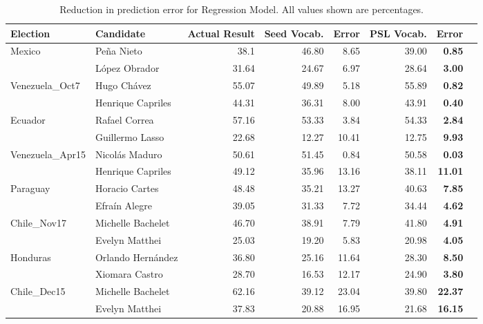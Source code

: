 \begin{table*}
		\centering
		\begin{tabular}{| l | l | r | r | r | r | r | r |}
		\hline
		Election & Candidate & Actual Result & Seed Vocab. & Error & PSL Vocab. & Error \\
		\hline
		\multirow{2}{*}{Mexico} & Pe\~{n}a Nieto & 38.1 & 46.80 & 8.65 & 39.00 & \textbf{0.85} \\\cline{2-7}
											   & L\'{o}pez Obrador & 31.64 & 24.67 & 6.97 & 28.64 & \textbf{3.00} \\
		\hline
		\multirow{2}{*}{Venezuela\_Oct7} & Hugo Ch\'{a}vez & 55.07 & 49.89 & 5.18 & 55.89 & \textbf{0.82}\\\cline{2-7}
																& Henrique Capriles & 44.31 & 36.31 & 8.00 & 43.91 & \textbf{0.40} \\
		\hline
		\multirow{2}{*}{Ecuador} & Rafael Correa & 57.16 & 53.33 & 3.84 & 54.33 & \textbf{2.84} \\\cline{2-7}
												 & Guillermo Lasso & 22.68 & 12.27 & 10.41 & 12.75 & \textbf{9.93} \\
		\hline
		 \multirow{2}{*}{Venezuela\_Apr15} & Nicol\'{a}s Maduro & 50.61 & 51.45 & 0.84 & 50.58 & \textbf{0.03} \\\cline{2-7}
																	& Henrique Capriles & 49.12 & 35.96 & 13.16 & 38.11 & \textbf{11.01} \\
		\hline
		\multirow{2}{*}{Paraguay} & Horacio Cartes & 48.48 & 35.21 & 13.27 & 40.63 & \textbf{7.85} \\\cline{2-7}
												   & Efra\'{i}n Alegre & 39.05 & 31.33 & 7.72 & 34.44 & \textbf{4.62} \\
		\hline
		\multirow{2}{*}{Chile\_Nov17} & Michelle Bachelet & 46.70 & 38.91 & 7.79 & 41.80 & \textbf{4.91}\\\cline{2-7}
														  & Evelyn Matthei & 25.03 & 19.20 & 5.83 & 20.98 & \textbf{4.05} \\
		\hline 
		\multirow{2}{*}{Honduras} & Orlando Hern\'{a}ndez & 36.80 & 25.16 & 11.64 & 28.30 & \textbf{8.50} \\\cline{2-7}
												   & Xiomara Castro & 28.70 & 16.53 & 12.17 & 24.90 & \textbf{3.80} \\
		\hline
		\multirow{2}{*}{Chile\_Dec15} & Michelle Bachelet & 62.16 & 39.12 & 23.04 & 39.80 & \textbf{22.37}\\\cline{2-7}
															& Evelyn Matthei & 37.83 & 20.88 & 16.95 & 21.68 & \textbf{16.15} \\
		\hline 											 
		\end{tabular}
		\caption{Reduction in prediction error for Regression Model. All values shown are percentages.}
		\label{table:RegModel}
	\end{table*}	


